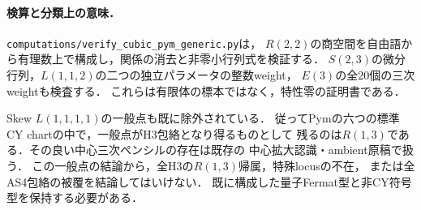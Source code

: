 \paragraph{検算と分類上の意味．}
\texttt{computations/verify\_cubic\_pym\_generic.py}は，
$R(2,2)$の商空間を自由語から有理数上で構成し，関係の消去と非零小行列式を検証する．
$S(2,3)$の微分行列，$L(1,1,2)$の二つの独立パラメータの整数weight，
$E(3)$の全20個の三次weightも検査する．
これらは有限体の標本ではなく，特性零の証明書である．

Skew $L(1,1,1,1)$の一般点も既に除外されている．
従ってPymの六つの標準CY chartの中で，一般点がH3包絡となり得るものとして
残るのは$R(1,3)$である．その良い中心三次ペンシルの存在は既存の
中心拡大認識・ambient原稿で扱う．
この一般点の結論から，全H3の$R(1,3)$帰属，特殊locusの不在，
または全AS4包絡の被覆を結論してはいけない．
既に構成した量子Fermat型と非CY符号型を保持する必要がある．
